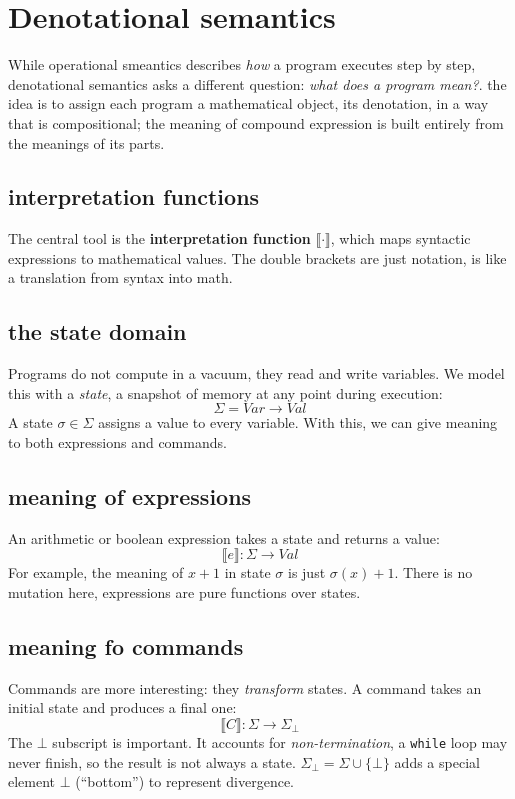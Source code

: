 \section{Denotational semantics}
While operational smeantics describes \emph{how} a program executes step by step, denotational semantics asks a different question: \emph{what does a program mean?}. the idea is to assign each program a mathematical object, its denotation, in a way that is compositional; the meaning of compound expression is built entirely from the meanings of its parts.

\subsection{interpretation functions}
The central tool is the \textbf{interpretation function} $\llbracket \cdot \rrbracket$, which maps syntactic expressions to mathematical values. The double brackets are just notation, is like a translation from syntax into math.

\subsection{the state domain}
Programs do not compute in a vacuum, they read and write variables. We model this with a \textit{state}, a snapshot of memory at any point during execution:
\[
  \Sigma = \mathit{Var} \to \mathit{Val}
\]
A state $\sigma \in \Sigma$ assigns a value to every variable. With this, we can give meaning to both expressions and commands.

\subsection{meaning of expressions}
An arithmetic or boolean expression takes a state and returns a value:\[
  \llbracket e \rrbracket : \Sigma \to \mathit{Val}
\]
For example, the meaning of $x + 1$ in state $\sigma$ is just $\sigma(x) + 1$. There is no mutation here, expressions are pure functions over states.

\subsection{meaning fo commands}
Commands are more interesting: they \emph{transform} states. A command takes an initial state and produces a final one:
\[
  \llbracket C \rrbracket : \Sigma \to \Sigma_\bot
\]
The $\bot$ subscript is important. It accounts for \emph{non-termination}, a \texttt{while} loop may never finish, so the result is not always a
state. $\Sigma_\bot = \Sigma \cup \{\bot\}$ adds a special element $\bot$ (``bottom'') to represent divergence.

